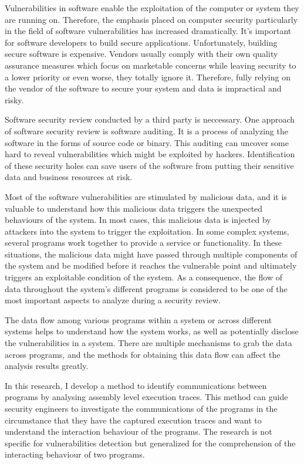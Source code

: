 \label{chapter:introduction}
Vulnerabilities in software enable the exploitation of the computer or system they are running on. Therefore, the emphasis placed on computer security particularly in the field of software vulnerabilities has increased dramatically. It's important for software developers to build secure applications. Unfortunately, building secure software is expensive. Vendors usually comply with their own quality assurance measures which focus on marketable concerns while leaving security to a lower priority or even worse, they totally ignore it. Therefore, fully relying on the vendor of the software to secure your system and data is impractical and risky. \cite{dowd_art_2006}

Software security review conducted by a third party is neccessary. One approach of software security review is software auditing. It is a process of analyzing the software in the forms of source code or binary. This auditing can uncover some hard to reveal vulnerabilities which might be exploited by hackers. Identification of these security holes can save users of the software from putting their sensitive data and business resources at risk. \cite{dowd_art_2006}

Most of the software vulnerabilities are stimulated by malicious data, and it is valuable to understand how this malicious data triggers the unexpected behaviours of the system. In most cases, this malicious data is injected by attackers into the system to trigger the exploitation. In some complex systems, several programs work together to provide a service or functionality. In these situations, the malicious data might have passed through multiple components of the system and be modified before it reaches the vulnerable point and ultimately triggers an exploitable condition of the system. As a consequence, the flow of data throughout the system's different programs is considered to be one of the most important aspects to analyze during a security review. \cite{dowd_art_2006}

The data flow among various programs within a system or across different systems helps to understand how the system works, as well as potentially disclose the vulnerabilities in a system. There are multiple mechanisms to grab the data across programs, and the methods for obtaining this data flow can affect the analysis results greatly. 

In this research, I develop a method to identify communications between programs by analysing assembly level execution traces. This method can guide security engineers to investigate the communications of the programs in the circumstance that they have the captured execution traces and want to understand the interaction behaviour of the programs. The research is not specific for vulnerabilities detection but generalized for the comprehension of the interacting behaviour of two programs.

